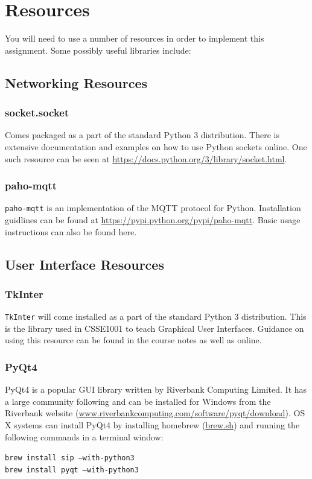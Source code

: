 \documentclass[a4paper, 12pt]{article}
\begin{document}
\pagebreak
\section{Resources}
You will need to use a number of resources in order to implement this
assignment. Some possibly useful libraries include: 

\subsection{Networking Resources}
\subsubsection*{socket.socket}
Comes packaged as a part of the standard Python 3 distribution. There is
extensive documentation and examples on how to use Python sockets online. One
such resource can be seen at \href{https://docs.python.org/3/library/socket.html}{https://docs.python.org/3/library/socket.html}.

\subsubsection*{paho-mqtt}
\texttt{paho-mqtt} is an implementation of the MQTT protocol for Python.
Installation guidlines can be found at
\href{https://pypi.python.org/pypi/paho-mqtt}
{https://pypi.python.org/pypi/paho-mqtt}. Basic usage instructions can also be
found here.

\subsection{User Interface Resources}
\subsubsection*{TkInter}
\texttt{TkInter} will come installed as a part of the standard Python 3
distribution. This is the library used in CSSE1001 to teach Graphical User
Interfaces. Guidance on using this resource can be found in the course notes as
well as online.

\subsubsection*{PyQt4}
PyQt4 is a popular GUI library written by Riverbank Computing Limited. It has a
large community following and can be installed for Windows from the Riverbank
website (\href{http://www.riverbankcomputing.com/software/pyqt/download}
{www.riverbankcomputing.com/software/pyqt/download}). OS X systems can install
PyQt4 by installing homebrew (\href{http://brew.sh}{brew.sh}) and running the following commands in a terminal window:\\[0.5\baselineskip]
\begin{adjustwidth}{50pt}{}
\texttt{brew install sip --with-python3}\\
\texttt{brew install pyqt --with-python3}\\[0.5\baselineskip]
\end{adjustwidth}
\end{document}
